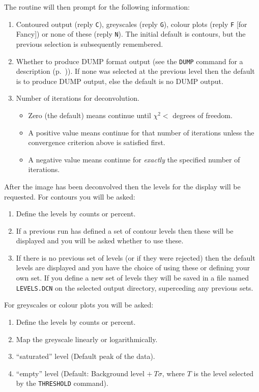 \begin{description}
The routine will then prompt for the following information:
\begin{enumerate}
\item Contoured output (reply {\tt C}), greyscales (reply {\tt G}), colour
plots (reply {\tt F} [for Fancy]) or none of these (reply {\tt N}). The
initial default is contours, but the previous selection is subsequently
remembered.
\item Whether to produce DUMP format output (see the {\tt DUMP} command for a
description (p.~\pageref{du})). If none was selected at the previous
level then the default is to produce DUMP output, else the default is no
DUMP output.
\item Number of iterations for deconvolution.
\begin{itemize}
\item Zero (the default) means continue until $\chi^2 < $ degrees of freedom.
\item A positive value means continue for that number of iterations unless the
convergence criterion above is satisfied first.
\item A negative value means continue for {\em exactly} the specified number of
iterations.
\end{itemize}
\end{enumerate}

After the image has been deconvolved then the levels for the display
will be requested. For contours you will be asked:
\begin{enumerate}
\item Define the levels by counts or percent.
\item If a previous run has defined a set of contour levels then these will
be displayed and you will be asked whether to use these.
\item If there is no previous set of levels (or if they were rejected) then
the default levels are displayed and you have the choice of using these
or defining your own set. If you define a new set of levels they will
be saved in a file named {\tt LEVELS.DCN} on the selected output
directory, superceding any previous sets.
\end{enumerate}
For greyscales or colour plots you will be asked:
\begin{enumerate}
\item Define the levels by counts or percent.
\item Map the greyscale linearly or logarithmically.
\item ``saturated'' level (Default peak of the data).
\item ``empty'' level (Default: Background level $ +~T\sigma $, where $T$ is
the level selected by the {\tt THRESHOLD} command).
\end{enumerate}


\end{description}
